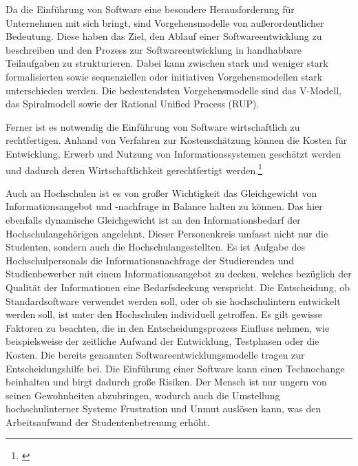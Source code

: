 Da die Einführung von Software eine besondere Herausforderung für Unternehmen mit sich bringt, sind Vorgehensmodelle von außerordentlicher Bedeutung. 
Diese haben das Ziel, den Ablauf einer Softwareentwicklung zu beschreiben und den Prozess zur Softwareentwicklung in handhabbare Teilaufgaben zu strukturieren. 
Dabei kann zwischen stark und weniger stark formalisierten sowie sequenziellen oder initiativen Vorgehensmodellen stark unterschieden werden. 
Die bedeutendsten Vorgehensmodelle sind das V-Modell, das Spiralmodell sowie der Rational Unified Process (RUP).

Ferner ist es notwendig die Einführung von Software wirtschaftlich zu rechtfertigen. Anhand von Verfahren zur Kostenschätzung können die Kosten für Entwicklung, Erwerb und Nutzung von Informationssystemen geschätzt werden und dadurch deren Wirtschaftlichkeit gerechtfertigt werden.\footnote{\cite{krcmar_einfuhrung_2015}}

Auch an Hochschulen ist es von großer Wichtigkeit das Gleichgewicht von Informationsangebot und -nachfrage in Balance halten zu können. 
Das hier ebenfalls dynamische Gleichgewicht ist an den Informationsbedarf der Hochschulangehörigen angelehnt. 
Dieser Personenkreis umfasst nicht nur die Studenten, sondern auch die Hochschulangestellten. 
Es ist Aufgabe des Hochschulpersonals die Informationsnachfrage der Studierenden und Studienbewerber mit einem Informationsangebot zu decken, welches bezüglich der Qualität der Informationen eine Bedarfsdeckung verspricht. 
Die Entscheidung, ob Standardsoftware verwendet werden soll, oder ob sie hochschulintern entwickelt werden soll, ist unter den Hochschulen individuell getroffen. 
Es gilt gewisse Faktoren zu beachten, die in den Entscheidungsprozess Einfluss nehmen, wie beispielsweise der zeitliche Aufwand der Entwicklung, Testphasen oder die Kosten. 
Die bereits genannten Softwareentwicklungsmodelle tragen zur Entscheidungshilfe bei.
Die Einführung einer Software kann einen Technochange beinhalten und birgt dadurch große Risiken. 
Der Mensch ist nur ungern von seinen Gewohnheiten abzubringen, wodurch auch die Umstellung hochschulinterner Systeme Frustration und Unmut auslösen kann, was den Arbeitsaufwand der Studentenbetreuung erhöht.
